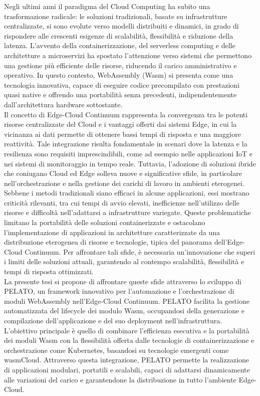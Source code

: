 Negli ultimi anni il paradigma del Cloud Computing\cite{Pallis2010Cloud} ha subito una trasformazione radicale: le soluzioni tradizionali, basate su infrastrutture centralizzate, si sono evolute verso modelli distribuiti e dinamici, in grado di rispondere alle crescenti esigenze di scalabilità, flessibilità e riduzione della latenza. L’avvento della containerizzazione\cite{Felter2015An}, del serverless computing e delle architetture a microservizi ha spostato l’attenzione verso sistemi che permettono una gestione più efficiente delle risorse, riducendo il carico amministrativo e operativo. In questo contesto, WebAssembly (Wasm)\cite{WasmSpec24} si presenta come una tecnologia innovativa, capace di eseguire codice precompilato con prestazioni quasi native e offrendo una portabilità senza precedenti, indipendentemente dall’architettura hardware sottostante.\\
Il concetto di Edge-Cloud Continuum\cite{Hoshikawa2019Edge} rappresenta la convergenza tra le potenti risorse centralizzate del Cloud e i vantaggi offerti dai sistemi Edge, in cui la vicinanza ai dati permette di ottenere bassi tempi di risposta e una maggiore reattività. Tale integrazione risulta fondamentale in scenari dove la latenza e la resilienza sono requisiti imprescindibili, come ad esempio nelle applicazioni IoT\cite{Laghari2021A} e nei sistemi di monitoraggio in tempo reale. Tuttavia, l’adozione di soluzioni ibride che coniugano Cloud ed Edge solleva nuove e significative sfide, in particolare nell’orchestrazione e nella gestione dei carichi di lavoro in ambienti eterogenei. Sebbene i metodi tradizionali siano efficaci in alcune applicazioni, essi mostrano criticità rilevanti, tra cui tempi di avvio elevati, inefficienze nell’utilizzo delle risorse e difficoltà nell’adattarsi a infrastrutture variegate. Queste problematiche limitano la portabilità delle soluzioni containerizzate e ostacolano l’implementazione di applicazioni in architetture caratterizzate da una distribuzione eterogenea di risorse e tecnologie, tipica del panorama dell’Edge-Cloud Continuum. Per affrontare tali sfide, è necessaria un’innovazione che superi i limiti delle soluzioni attuali, garantendo al contempo scalabilità, flessibilità e tempi di risposta ottimizzati\cite{10682874}.\\
La presente tesi si propone di affrontare queste sfide attraverso lo sviluppo di PELATO, un framework innovativo per l’automazione e l’orchestrazione di moduli WebAssembly nell’Edge-Cloud Continuum. PELATO facilita la gestione automatizzata del lifecycle dei modulo Wasm, occupandosi della generazione e compilazione dell'applicazione e del suo deployment nell'infrastruttura. L’obiettivo principale è quello di combinare l’efficienza esecutiva e la portabilità dei moduli Wasm con la flessibilità offerta dalle tecnologie di containerizzazione e orchestrazione come Kubernetes\cite{Rejiba2022Custom}, basandosi su tecnologie emergenti come wasmCloud\cite{wasmcloud}. Attraverso questa integrazione, PELATO permette la realizzazione di applicazioni modulari, portatili e scalabili, capaci di adattarsi dinamicamente alle variazioni del carico e garantendone la distribuzione in tutto l'ambiente Edge-Cloud.\\
